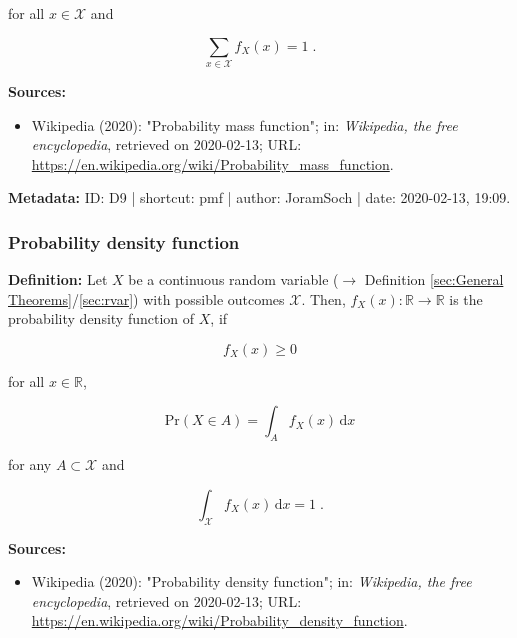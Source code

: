 \documentclass[a4paper,12pt,twoside]{book}
\begin{document}
for all $x \in \mathcal{X}$ and

\begin{equation} \label{eq:pmf-pmf-def-s2}
\sum_{x \in \mathcal{X}} f_X(x) = 1 \; .
\end{equation}


\vspace{1em}
\textbf{Sources:}
\begin{itemize}
\item Wikipedia (2020): "Probability mass function"; in: \textit{Wikipedia, the free encyclopedia}, retrieved on 2020-02-13; URL: \url{https://en.wikipedia.org/wiki/Probability_mass_function}.
\end{itemize}


\vspace{1em}
\textbf{Metadata:} ID: D9 | shortcut: pmf | author: JoramSoch | date: 2020-02-13, 19:09.
\vspace{1em}



\subsubsection[\textit{Probability density function}]{Probability density function} \label{sec:pdf}
\setcounter{equation}{0}

\textbf{Definition:} Let $X$ be a continuous random variable ($\rightarrow$ Definition \ref{sec:General Theorems}/\ref{sec:rvar}) with possible outcomes $\mathcal{X}$. Then, $f_X(x): \mathbb{R} \to \mathbb{R}$ is the probability density function of $X$, if

\begin{equation} \label{eq:pdf-pdf-def-s0}
f_X(x) \geq 0
\end{equation}

for all $x \in \mathbb{R}$,

\begin{equation} \label{eq:pdf-pdf-def-s1}
\mathrm{Pr}(X \in A) = \int_{A} f_X(x) \, \mathrm{d}x
\end{equation}

for any $A \subset \mathcal{X}$ and

\begin{equation} \label{eq:pdf-pdf-def-s2}
\int_{\mathcal{X}} f_X(x) \, \mathrm{d}x = 1 \; .
\end{equation}


\vspace{1em}
\textbf{Sources:}
\begin{itemize}
\item Wikipedia (2020): "Probability density function"; in: \textit{Wikipedia, the free encyclopedia}, retrieved on 2020-02-13; URL: \url{https://en.wikipedia.org/wiki/Probability_density_function}.
\end{itemize}
\end{document}
